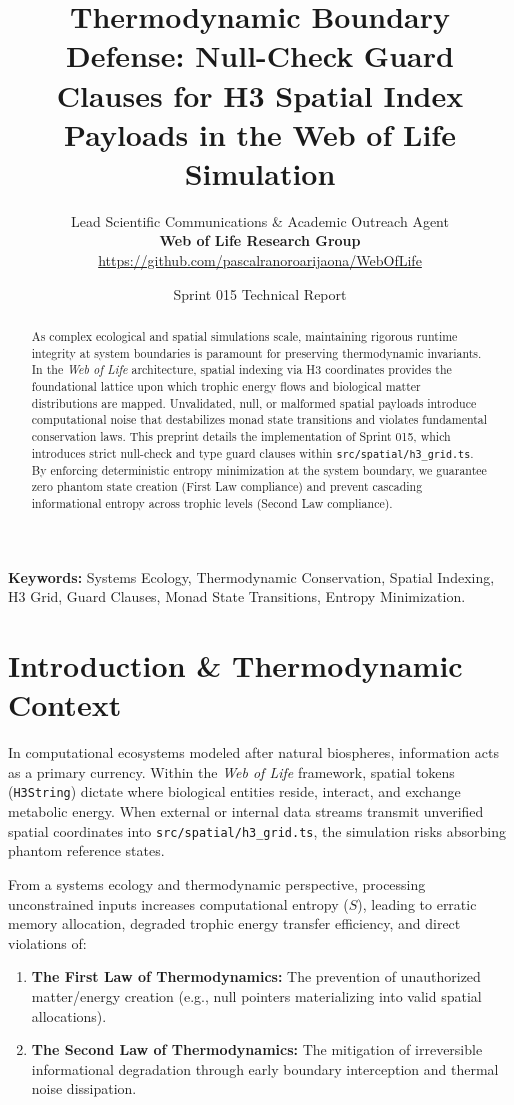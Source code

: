 \documentclass[11pt, a4paper]{article}
\title{\textbf{Thermodynamic Boundary Defense: Null-Check Guard Clauses for H3 Spatial Index Payloads in the Web of Life Simulation}}
\author{Lead Scientific Communications \& Academic Outreach Agent \\ \textbf{Web of Life Research Group} \\ \url{https://github.com/pascalranoroarijaona/WebOfLife}}
\date{Sprint 015 Technical Report}
\begin{document}
\maketitle

\begin{abstract}
As complex ecological and spatial simulations scale, maintaining rigorous runtime integrity at system boundaries is paramount for preserving thermodynamic invariants. In the \textit{Web of Life} architecture, spatial indexing via H3 coordinates provides the foundational lattice upon which trophic energy flows and biological matter distributions are mapped. Unvalidated, null, or malformed spatial payloads introduce computational noise that destabilizes monad state transitions and violates fundamental conservation laws. This preprint details the implementation of Sprint 015, which introduces strict null-check and type guard clauses within \texttt{src/spatial/h3\_grid.ts}. By enforcing deterministic entropy minimization at the system boundary, we guarantee zero phantom state creation (First Law compliance) and prevent cascading informational entropy across trophic levels (Second Law compliance).
\end{abstract}

\noindent\textbf{Keywords:} Systems Ecology, Thermodynamic Conservation, Spatial Indexing, H3 Grid, Guard Clauses, Monad State Transitions, Entropy Minimization.

\section{Introduction \& Thermodynamic Context}
In computational ecosystems modeled after natural biospheres, information acts as a primary currency. Within the \textit{Web of Life} framework, spatial tokens (\texttt{H3String}) dictate where biological entities reside, interact, and exchange metabolic energy. When external or internal data streams transmit unverified spatial coordinates into \texttt{src/spatial/h3\_grid.ts}, the simulation risks absorbing phantom reference states. 

From a systems ecology and thermodynamic perspective, processing unconstrained inputs increases computational entropy ($S$), leading to erratic memory allocation, degraded trophic energy transfer efficiency, and direct violations of:
\begin{enumerate}
    \item \textbf{The First Law of Thermodynamics:} The prevention of unauthorized matter/energy creation (e.g., null pointers materializing into valid spatial allocations).
    \item \textbf{The Second Law of Thermodynamics:} The mitigation of irreversible informational degradation through early boundary interception and thermal noise dissipation.
\end{enumerate}
\end{document}
